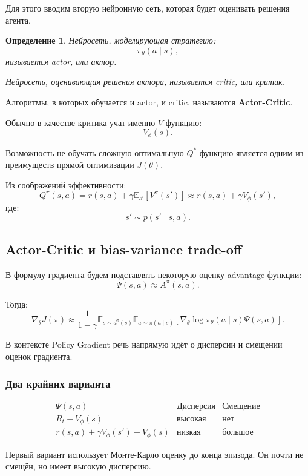 \documentclass[12pt,a4paper]{article}
\newtheorem{definition}{Определение}
\begin{document}
Для этого вводим вторую нейронную сеть, которая будет оценивать решения агента.

\begin{definition}
Нейросеть, моделирующая стратегию:
\[
\pi_\theta(a\mid s),
\]
называется actor, или актор.

Нейросеть, оценивающая решения актора, называется critic, или критик.
\end{definition}

Алгоритмы, в которых обучается и actor, и critic, называются \textbf{Actor-Critic}.

Обычно в качестве критика учат именно $V$-функцию:
\[
V_\phi(s).
\]

Возможность не обучать сложную оптимальную $Q^\ast$-функцию является одним из преимуществ прямой оптимизации $J(\theta)$.

Из соображений эффективности:
\[
Q^\pi(s,a)
=
r(s,a)
+
\gamma
\mathbb E_{s'}
\left[
V^\pi(s')
\right]
\approx
r(s,a)
+
\gamma V_\phi(s'),
\]
где:
\[
s'\sim p(s'\mid s,a).
\]

\subsection{Actor-Critic и bias-variance trade-off}

В формулу градиента будем подставлять некоторую оценку advantage-функции:
\[
\Psi(s,a)
\approx
A^\pi(s,a).
\]

Тогда:
\[
\nabla_\theta J(\pi)
\approx
\frac{1}{1-\gamma}
\mathbb E_{s\sim d^\pi(s)}
\mathbb E_{a\sim\pi(a\mid s)}
\left[
\nabla_\theta
\log \pi_\theta(a\mid s)
\Psi(s,a)
\right].
\]

В контексте Policy Gradient речь напрямую идёт о дисперсии и смещении оценок градиента.

\subsubsection{Два крайних варианта}

\[
\begin{array}{c|c|c}
\Psi(s,a) & \text{Дисперсия} & \text{Смещение} \\
\hline
R_t - V_\phi(s) & \text{высокая} & \text{нет} \\
r(s,a)+\gamma V_\phi(s')-V_\phi(s) & \text{низкая} & \text{большое}
\end{array}
\]

Первый вариант использует Монте-Карло оценку до конца эпизода. Он почти не смещён, но имеет высокую дисперсию.
\end{document}
